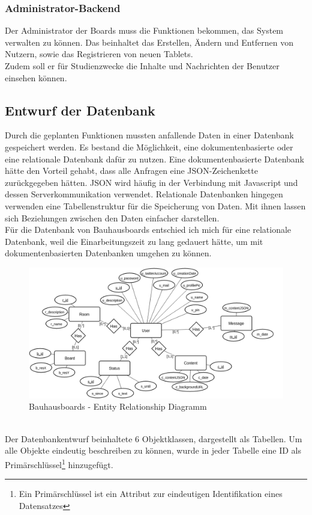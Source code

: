 \subsubsection{Administrator-Backend}\label{Administrator-Backend}
Der Administrator der Boards muss die Funktionen bekommen, das System verwalten zu können. Das beinhaltet das Erstellen, Ändern und Entfernen von Nutzern, sowie das Registrieren von neuen Tablets.
\\
Zudem soll er für Studienzwecke die Inhalte und Nachrichten der Benutzer einsehen können.

\subsection{Entwurf der Datenbank}\label{Entwurf der Datenbank}
Durch die geplanten Funktionen mussten anfallende Daten in einer Datenbank gespeichert werden.
Es bestand die Möglichkeit, eine dokumentenbasierte oder eine relationale Datenbank dafür zu nutzen.
Eine dokumentenbasierte Datenbank hätte den Vorteil gehabt, dass alle Anfragen eine JSON-Zeichenkette zurückgegeben hätten. JSON wird häufig in der Verbindung mit Javascript und dessen Serverkommunikation verwendet.
Relationale Datenbanken hingegen verwenden eine Tabellenstruktur für die Speicherung von Daten. Mit ihnen lassen sich Beziehungen zwischen den Daten einfacher darstellen.
\\
Für die Datenbank von Bauhausboards entschied ich mich für eine relationale Datenbank, weil die Einarbeitungszeit zu lang gedauert hätte, um mit dokumentenbasierten Datenbanken umgehen zu können.
\begin{figure}[h!]
  \centering
    \includegraphics[width=1\textwidth]{./img/ER01.png}
  \caption{Bauhausboards - Entity Relationship Diagramm}
  \label{img:ER01}
\end{figure}
\\
Der Datenbankentwurf beinhaltete 6 Objektklassen, dargestellt als Tabellen. Um alle Objekte eindeutig beschreiben zu können, wurde in jeder Tabelle eine ID als Primärschlüssel\footnote{Ein Primärschlüssel ist ein Attribut zur eindeutigen Identifikation eines Datensatzes} hinzugefügt.
